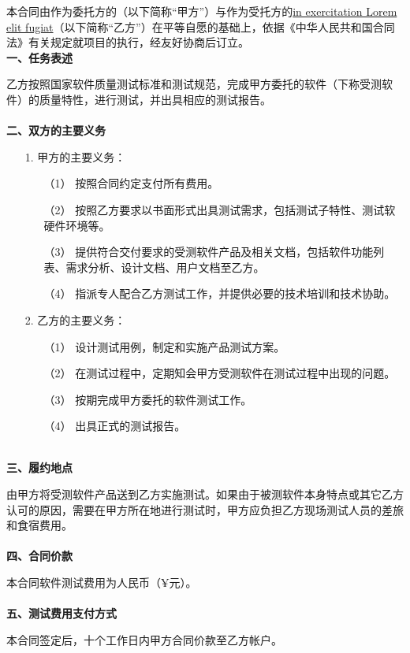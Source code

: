 \documentclass[12pt]{article}%
\begin{document}
\newpage
\setcounter{page}{1}
\noindent %
本合同由作为委托方的\uline{}（以下简称“甲方”）与作为受托方的\uline{in exercitation Lorem elit fugiat}（以下简称“乙方”）在平等自愿的基础上，依据《中华人民共和国合同法》有关规定就项目的执行，经友好协商后订立。\\
\textbf{一、任务表述}
\par
乙方按照国家软件质量测试标准和测试规范，完成甲方委托的软件（下称受测软件）\uline{}的质量特性\uline{}，进行测试，并出具相应的测试报告。\\
\\
\textbf{二、双方的主要义务}
\begin{itemize}
\item[1.] 甲方的主要义务：
\begin{itemize}
\item[（1）] 按照合同约定支付所有费用。
\item[（2）] 按照乙方要求以书面形式出具测试需求，包括测试子特性、测试软硬件环境等。
\item[（3）] 提供符合交付要求的受测软件产品及相关文档，包括软件功能列表、需求分析、设计文档、用户文档至乙方。
\item[（4）] 指派专人配合乙方测试工作，并提供必要的技术培训和技术协助。
\end{itemize}
\item[2.] 乙方的主要义务：
\begin{itemize}
\item[（1）] 设计测试用例，制定和实施产品测试方案。
\item[（2）] 在测试过程中，定期知会甲方受测软件在测试过程中出现的问题。
\item[（3）] 按期完成甲方委托的软件测试工作。
\item[（4）] 出具正式的测试报告。
\end{itemize}
\end{itemize}
~\\
\textbf{三、履约地点}
\par
由甲方将受测软件产品送到乙方实施测试。如果由于被测软件本身特点或其它乙方认可的原因，需要在甲方所在地进行测试时，甲方应负担乙方现场测试人员的差旅和食宿费用。\\
\\
\textbf{四、合同价款}
\par
本合同软件测试费用为人民币\uline{}（¥\uline{}元）。\\
\\
\textbf{五、测试费用支付方式}
\par
本合同签定后，十个工作日内甲方合同价款至乙方帐户。\\
\end{document}
